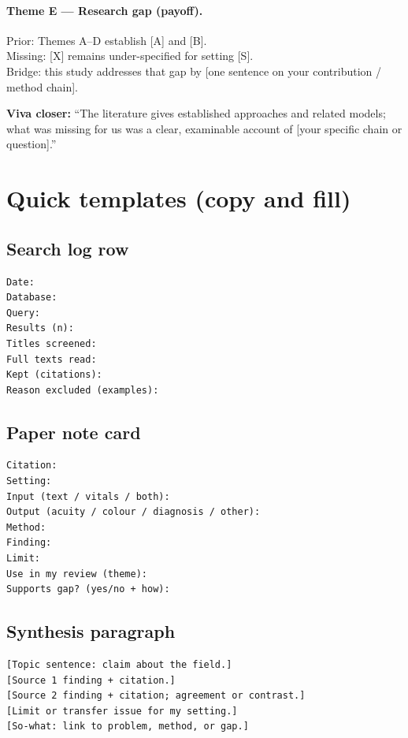 \documentclass[11pt,a4paper]{article}
\begin{document}
\paragraph{Theme E --- Research gap (payoff).}
Prior: Themes A--D establish [A] and [B].\\
Missing: [X] remains under-specified for setting [S].\\
Bridge: this study addresses that gap by [one sentence on your contribution / method chain].

\begin{tipbox}
\textbf{Viva closer:} ``The literature gives established approaches and related models; what was missing for us was a clear, examinable account of [your specific chain or question].''
\end{tipbox}

\section{Quick templates (copy and fill)}

\subsection{Search log row}
\begin{lstlisting}
Date:
Database:
Query:
Results (n):
Titles screened:
Full texts read:
Kept (citations):
Reason excluded (examples):
\end{lstlisting}

\subsection{Paper note card}
\begin{lstlisting}
Citation:
Setting:
Input (text / vitals / both):
Output (acuity / colour / diagnosis / other):
Method:
Finding:
Limit:
Use in my review (theme):
Supports gap? (yes/no + how):
\end{lstlisting}

\subsection{Synthesis paragraph}
\begin{lstlisting}
[Topic sentence: claim about the field.]
[Source 1 finding + citation.]
[Source 2 finding + citation; agreement or contrast.]
[Limit or transfer issue for my setting.]
[So-what: link to problem, method, or gap.]
\end{lstlisting}
\end{document}
